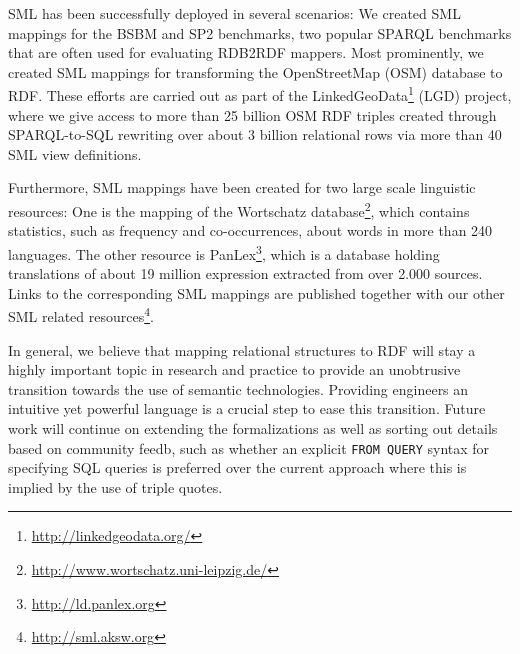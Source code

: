 SML has been successfully deployed in several scenarios:
We created SML mappings for the BSBM and SP2 benchmarks, two
popular SPARQL benchmarks that are often used for evaluating RDB2RDF
mappers.
Most prominently, we created SML mappings for transforming the
OpenStreetMap (OSM) database to RDF. These efforts are carried out
as part of the LinkedGeoData\footnote{\url{http://linkedgeodata.org/}} (LGD) project,
where we give access to more than 25 billion OSM RDF triples created through
SPARQL-to-SQL rewriting over about 3 billion relational rows via more than 40
SML view definitions.

Furthermore, SML mappings have been created for two large scale
linguistic resources: One is the mapping of the Wortschatz
database\footnote{\url{http://www.wortschatz.uni-leipzig.de/}}, which contains
statistics, such as frequency and co-occurrences, about words in more
than 240 languages.
The other resource is PanLex\footnote{\url{http://ld.panlex.org}}, which is
a database holding translations of about 19 million expression extracted from
over 2.000 sources. Links to the corresponding SML mappings are published
together with our other SML related
resources\footnote{\url{http://sml.aksw.org}}.

In general, we believe that mapping relational structures to RDF will stay a highly important topic in research and practice to provide an unobtrusive transition towards the use of semantic technologies.
Providing engineers an intuitive yet powerful language is a crucial step to ease this transition.
Future work will continue on extending the formalizations as well as sorting out details based on community feedb,
such as whether an explicit \texttt{FROM QUERY} syntax for specifying SQL queries is preferred over
the current approach where this is implied by the use of triple quotes.

